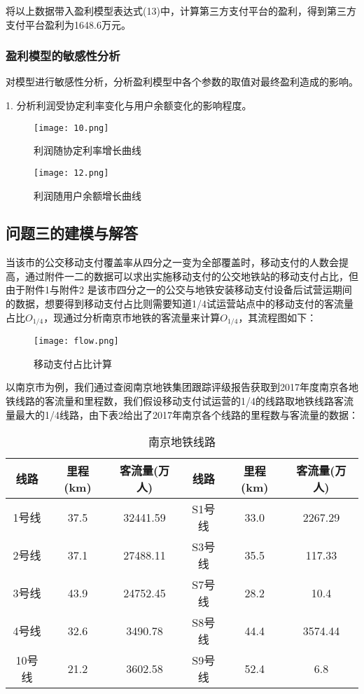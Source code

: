 \documentclass[withoutpreface,bwprint]{cumcmthesis} %
\begin{document}
将以上数据带入盈利模型表达式(13)中，计算第三方支付平台的盈利，得到第三方支付平台盈利为1648.6万元。
\subsubsection{盈利模型的敏感性分析}
对模型进行敏感性分析，分析盈利模型中各个参数的取值对最终盈利造成的影响。

1. 分析利润受协定利率变化与用户余额变化的影响程度。
\begin{figure}[h]
\centering
\begin{minipage}[c]{0.4\textwidth}
\centering
\texttt{[image: 10.png]}
\caption{利润随协定利率增长曲线}
\end{minipage}
\begin{minipage}[c]{0.4\textwidth}
\centering
\texttt{[image: 12.png]}
\caption{利润随用户余额增长曲线}
\end{minipage}
\end{figure}
\subsection{问题三的建模与解答}
当该市的公交移动支付覆盖率从四分之一变为全部覆盖时，移动支付的人数会提高，通过附件一二的数据可以求出实施移动支付的公交地铁站的移动支付占比，但由于附件1与附件2 是该市四分之一的公交与地铁安装移动支付设备后试营运期间的数据，想要得到移动支付占比则需要知道1/4试运营站点中的移动支付的客流量占比$O_{1/4}$，现通过分析南京市地铁的客流量来计算$O_{1/4}$，其流程图如下：

\begin{figure}[h]
\centering
\texttt{[image: flow.png]}
\caption{移动支付占比计算}
\end{figure}
以南京市为例，我们通过查阅南京地铁集团跟踪评级报告获取到2017年度南京各地铁线路的客流量和里程数，我们假设移动支付试运营的1/4的线路取地铁线路客流量最大的1/4线路，由下表2给出了2017年南京各个线路的里程数与客流量的数据：
\begin{center}
\makeatletter{}\makeatother
\begin{table}[h]
\centering
\caption{南京地铁线路}\label{tab:aStrangeTable}\centering%
\begin{tabular}{c|c|c|c|c|c}\hline
线路&里程(km)&客流量(万人)&线路&里程(km)&客流量(万人)\\\hline
1号线&37.5&32441.59&S1号线&33.0&2267.29\\
2号线&37.1&27488.11&S3号线&35.5&117.33\\
3号线&43.9&24752.45&S7号线&28.2&10.4\\
4号线&32.6&3490.78&S8号线&44.4&3574.44\\
10号线&21.2&3602.58&S9号线&52.4&6.8\\\hline
\end{tabular}
\end{table}
\end{center}
\end{document}
